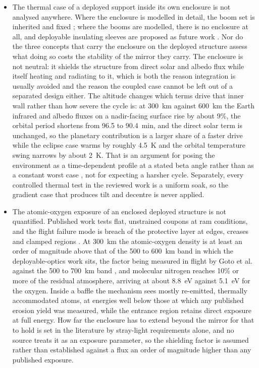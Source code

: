 \begin{itemize}
    \item The thermal case of a deployed support inside its own enclosure is not analysed anywhere. Where the enclosure is modelled in detail, the boom set is inherited and fixed \cite{hu_thermo-optical_2022}; where the booms are modelled, there is no enclosure at all, and deployable insulating sleeves are proposed as future work \cite{de_zanet_predicted_2023}. Nor do the three concepts that carry the enclosure on the deployed structure assess what doing so costs the stability of the mirror they carry. The enclosure is not neutral: it shields the structure from direct solar and albedo flux while itself heating and radiating to it, which is both the reason integration is usually avoided and the reason the coupled case cannot be left out of a separated design either. The altitude changes which terms drive that inner wall rather than how severe the cycle is: at \SI{300}{\kilo\meter} against \SI{600}{\kilo\meter} the Earth infrared and albedo fluxes on a nadir-facing surface rise by about 9\%, the orbital period shortens from 96.5 to \SI{90.4}{\minute}, and the direct solar term is unchanged, so the planetary contribution is a larger share of a faster drive while the eclipse case warms by roughly \SI{4.5}{\kelvin} and the orbital temperature swing narrows by about \SI{2}{\kelvin}. That is an argument for posing the environment as a time-dependent profile at a stated beta angle rather than as a constant worst case \cite{gonzalez-barcena_selection_2022}, not for expecting a harsher cycle. Separately, every controlled thermal test in the reviewed work is a uniform soak, so the gradient case that produces tilt and decentre is never applied.

    \item The atomic-oxygen exposure of an enclosed deployed structure is not quantified. Published work tests flat, unstrained coupons at ram conditions, and the flight failure mode is breach of the protective layer at edges, creases and clamped regions \cite{goto_changes_2023, smith_complete_2021}. At \SI{300}{\kilo\meter} the atomic-oxygen density is at least an order of magnitude above that of the 500 to \SI{600}{\kilo\meter} band in which the deployable-optics work sits, the factor being measured in flight by Goto et al. against the 500 to \SI{700}{\kilo\meter} band \cite{goto_changes_2023}, and molecular nitrogen reaches 10\% or more of the residual atmosphere, arriving at about \SI{8.8}{\electronvolt} against \SI{5.1}{\electronvolt} for the oxygen. Inside a baffle the mechanism sees mostly re-emitted, thermally accommodated atoms, at energies well below those at which any published erosion yield was measured, while the entrance region retains direct exposure at full energy. How far the enclosure has to extend beyond the mirror for that to hold is set in the literature by stray-light requirements alone, and no source treats it as an exposure parameter, so the shielding factor is assumed rather than established against a flux an order of magnitude higher than any published exposure.
\end{itemize}

